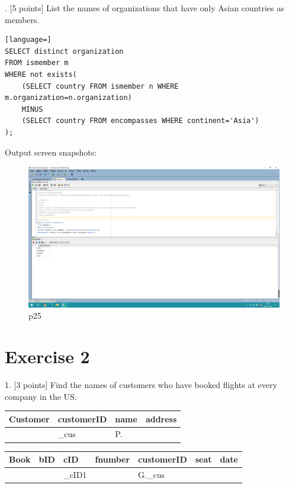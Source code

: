 \documentclass[]{article}
\begin{document}
	. [5 points] List the names of organizations that have only Asian countries as members.   \\
	
	\begin{lstlisting}[language=] 
SELECT distinct organization
FROM ismember m
WHERE not exists(
	(SELECT country FROM ismember n WHERE m.organization=n.organization)
	MINUS
	(SELECT country FROM encompasses WHERE continent='Asia')
);
	\end{lstlisting} 
	Output screen snapshots:
	\begin{figure}[H]
		\centering
		\includegraphics[width=1\linewidth]{../screen/p25}
		\caption{p25}
		\label{fig:p25}
	\end{figure}
	
	\clearpage
	
	\section{Exercise 2}
	
	1. [3 points] Find the names of customers who have booked flights at every company in the US.  \\
	
	\begin{table}[H]
		\begin{tabular}{|l|l|l|l|}
			\hline
			Customer & customerID & name & address \\ \hline
					 &  \_cus     &  P.  &  	   \\ \hline
		\end{tabular}
	\end{table}

	\begin{table}[H]
		\begin{tabular}{|l|l|l|l|l|l|l|}
			\hline
			Book & bID & cID & fnumber & customerID & seat & date \\ \hline
				 & 	   & \_cID1 &      &  G.\_cus	& 	   &  	  \\ \hline
		\end{tabular}
	\end{table}
\end{document}
